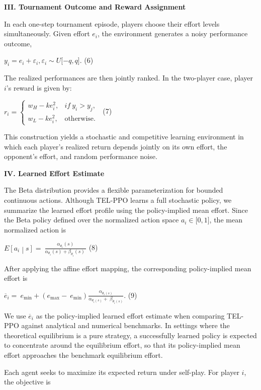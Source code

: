 \documentclass[
]{article}
\begin{document}
\textbf{III. Tournament Outcome and Reward Assignment}

In each one-step tournament episode, players choose their effort levels
simultaneously. Given effort \(e_{i}\), the environment generates a
noisy performance outcome,

\(y_{i} = e_{i} + \varepsilon_{i},\varepsilon_{i} \sim U\lbrack - q,q\rbrack\).
(6)

The realized performances are then jointly ranked. In the two-player
case, player \(i\)'s reward is given by:

\(r_{i} = \left\{ \begin{matrix}
w_{H} - ke_{i}^{2}, & if\ y_{i} > y_{j}, \\
w_{L} - ke_{i}^{2}, & \text{otherwise.}
\end{matrix} \right.\ \) (7)

This construction yields a stochastic and competitive learning
environment in which each player's realized return depends jointly on
its own effort, the opponent's effort, and random performance noise.

\textbf{IV. Learned Effort Estimate}

The Beta distribution provides a flexible parameterization for bounded
continuous actions. Although TEL-PPO learns a full stochastic policy, we
summarize the learned effort profile using the policy-implied mean
effort. Since the Beta policy defined over the normalized action space
\(a_{i} \in \lbrack 0,1\rbrack\), the mean normalized action is

\(E\left\lbrack a_{i} \middle| s \right\rbrack = \ \frac{\alpha_{\theta_{i}}(s)}{\alpha_{\theta_{i}}(s) + \beta_{\theta_{i}}(s)\ }\)
(8)

After applying the affine effort mapping, the corresponding
policy-implied mean effort is

\({\overline{e}}_{i} = \ e_{\min} + \left( e_{\max} - \ e_{\min} \right)\frac{\alpha_{\theta_{i}(s)}}{\alpha_{\theta_{i}(s)} + \ \beta_{\theta_{i}(s)}}\).
(9)

We use \({\overline{e}}_{i}\) as the policy-implied learned effort
estimate when comparing TEL-PPO against analytical and numerical
benchmarks. In settings where the theoretical equilibrium is a pure
strategy, a successfully learned policy is expected to concentrate
around the equilibrium effort, so that its policy-implied mean effort
approaches the benchmark equilibrium effort.

Each agent seeks to maximize its expected return under self-play. For
player \(i\), the objective is
\end{document}
